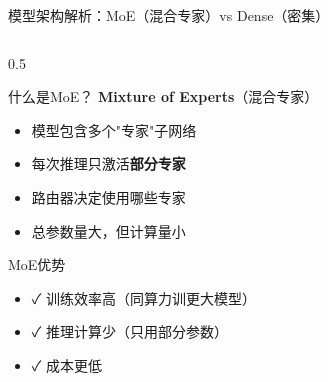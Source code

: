 \documentclass[aspectratio=169,11pt]{beamer}
\begin{document}
\begin{frame}{模型架构解析：MoE（混合专家）vs Dense（密集）}
    \begin{columns}
        \begin{column}{0.5\textwidth}
            \begin{block}{什么是MoE？}
                \small
                \textbf{Mixture of Experts}（混合专家）
                \begin{itemize}
                    \item 模型包含多个"专家"子网络
                    \item 每次推理只激活\textbf{部分专家}
                    \item 路由器决定使用哪些专家
                    \item 总参数量大，但计算量小
                \end{itemize}
            \end{block}
            
            \vspace{0.2cm}
            \begin{exampleblock}{MoE优势}
                \scriptsize
                \begin{itemize}
                    \item \textcolor{green!70!black}{\faCheck} 训练效率高（同算力训更大模型）
                    \item \textcolor{green!70!black}{\faCheck} 推理计算少（只用部分参数）
                    \item \textcolor{green!70!black}{\faCheck} 成本更低
                \end{itemize}
            \end{exampleblock}
            

\end{column}
\end{columns}
\end{frame}
\end{document}
